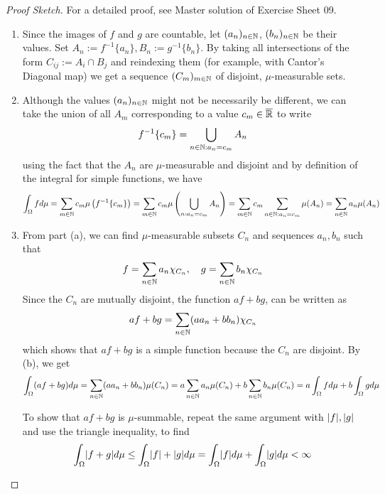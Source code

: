 \begin{proof}[Proof Sketch]
  For a detailed proof, see Master solution of Exercise Sheet 09.
  \begin{enumerate}
    \item Since the images of $f$ and $g$ are countable, let $(a_n)_{n \in \mathbb{N}}$, $(b_n)_{n \in  \mathbb{N}}$ be their values.
      Set $A_n := f^{-1}\{a_n\}, B_n := g^{-1}\{b_n\}$. 
      By taking all intersections of the form $C_{ij} := A_i \cap B_j$ and reindexing them (for example, with Cantor's Diagonal map) we get a sequence  $(C_m)_{m \in \mathbb{N}}$ of disjoint, $\mu$-measurable sets.
    \item Although the values $(a_n)_{n \in \mathbb{N}}$ might not be necessarily be different, we can take the union of all $A_m$ corresponding to a value $c_m \in \overline{\mathbb{R}}$ to write
      \begin{align*}
        f^{-1}\{c_m\} = \bigcup_{n \in \mathbb{N}: a_n = c_m} A_n
      \end{align*}
      using the fact that the $A_n$ are $\mu$-measurable and disjoint 
      and by definition of the integral for simple functions, we have
      \begin{align*}
        \int_{\Omega} f d \mu
        =
        \sum_{m \in \mathbb{N}} c_m \mu\left(
          f^{-1}\{c_m\}
        \right)
        =
        \sum_{m \in \mathbb{N}} c_m \mu\left(
          \bigcup_{n: a_n = c_m}A_n
        \right)
        =
        \sum_{m \in \mathbb{N}} c_m \sum_{n\in \mathbb{N}: a_n = c_m} \mu(A_n) 
        = 
        \sum_{n \in \mathbb{N}} a_n \mu(A_n)
      \end{align*}
    \item From part (a), we can find $\mu$-measurable subsets $C_n$ and sequences $a_n,b_n$ such that
      \begin{align*}
        f = \sum_{n \in \mathbb{N}}a_n \chi_{C_n}, \quad g = \sum_{n \in \mathbb{N}} b_n \chi_{C_n}
      \end{align*}
      Since the $C_n$ are mutually disjoint,
      the function $af + bg$, can be written as
      \begin{align*}
        af + bg = \sum_{n \in \mathbb{N}} (aa_n + bb_n)\chi_{C_n}
      \end{align*}
      which shows that $a f + bg$ is a simple function because the $C_n$ are disjoint.
      By (b), we get
      \begin{align*}
        \int_{\Omega} (af + bg) d \mu = \sum_{n \in \mathbb{N}} (aa_n + bb_n) \mu(C_n) = a\sum_{n \in \mathbb{N}}a_n \mu(C_n) + b\sum_{n \in \mathbb{N}} b_n \mu(C_n) = a\int_{\Omega} f d \mu + b\int_{\Omega} g d \mu
      \end{align*}

      To show that $a f + bg$ is $\mu$-summable, repeat the same argument with $\vert f\vert,\vert g\vert$ and use the triangle inequality, to find
      \begin{align*}
        \int_{\Omega} \abs{f+g} d \mu
        \leq
        \int_{\Omega} \abs{f} + \abs{g} d \mu
        = \int_{\Omega} \abs{f} d \mu + \int_{\Omega} \abs{g} d \mu < \infty
      \end{align*}
  \end{enumerate}
\end{proof}
